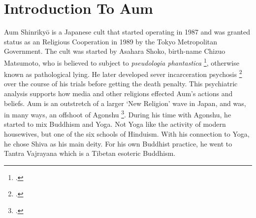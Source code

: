 \documentclass[12pt, letterpaper]{article}
\newcommand{\sorta}[1]{`#1'}
\newcommand{\poses}[1]{#1's}
\begin{document}
\section{Introduction To Aum}
Aum Shinriky\=o is a Japanese cult that started operating in 1987 and was granted status as an Religious
Cooperation in 1989 by the Tokyo Metropolitan Government. The cult was started by Asahara Shoko, birth-name
Chizuo Matsumoto, who is believed to subject to \textit{pseudologia phantastica}
\footcite[5]{olson_aum_1999}, otherwise known as pathological lying. He later developed sever
incarceration psychosis \footcite[6]{olson_aum_1999} over the course of his trials before getting
the death penalty. This psychiatric analysis supports how media and other religions effected \poses{Aum}
actions and beliefs. Aum is an outstretch of a larger \sorta{New Religion} wave in Japan, and was, in many
ways, an offshoot of Agonshu \footcite[82,83]{watanabe_religion_1998}. During his time with Agonshu, he
started to mix Buddhism and Yoga. Not Yoga like the activity of modern housewives, but one of the six
schools of Hinduism. With his connection to Yoga, he chose Shiva as his main deity. For his own Buddhist
practice, he went to Tantra Vajrayana which is a Tibetan esoteric Buddhism.
\end{document}
